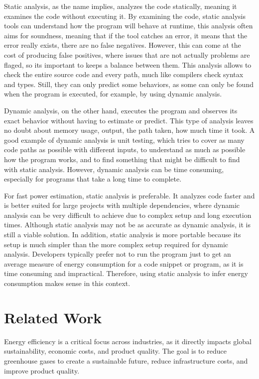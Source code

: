 \documentclass[sigplan]{acmart}
\begin{document}
Static analysis, as the name implies, analyzes the code statically, meaning it examines the code without executing it. By examining the code, static analysis tools can understand how the program will behave at runtime\cite{ernst2003static}, this analysis often aims for soundness, meaning that if the tool catches an error, it means that the error really exists, there are no false negatives. However, this can come at the cost of producing false positives, where issues that are not actually problems are flaged, so its important to keeps a balance between them. This analysis allows to check the entire source code and every path, much like compilers check syntax and types. Still, they can only predict some behaviors, as some can only be found when the program is executed, for example, by using dynamic analysis.

Dynamic analysis, on the other hand, executes the program and observes its exact behavior without having to estimate or predict. This type of analysis leaves no doubt about memory usage, output, the path taken, how much time it took\cite{ernst2003static}. A good example of dynamic analysis is unit testing, which tries to cover as many code paths as possible with different inputs, to understand as much as possible how the program works, and to find something that might be difficult to find with static analysis. However, dynamic analysis can be time consuming, especially for programs that take a long time to complete.

For fast power estimation, static analysis is preferable. It analyzes code faster and is better suited for large projects with multiple dependencies, where dynamic analysis can be very difficult to achieve due to complex setup and long execution times. Although static analysis may not be as accurate as dynamic analysis, it is still a viable solution. In addition, static analysis is more portable because its setup is much simpler than the more complex setup required for dynamic analysis.
Developers typically prefer not to run the program just to get an average measure of energy consumption for a code snippet or program, as it is time consuming and impractical. Therefore, using static analysis to infer energy consumption makes sense in this context.


\section{Related Work} \label{sec:relatedwork}

Energy efficiency is a critical focus across industries, as it directly impacts global sustainability, economic costs, and product quality.  The goal is to reduce greenhouse gases to create a sustainable future, reduce infrastructure costs, and improve product quality\cite{annurev:/content/journals/10.1146/annurev.resource.102308.124234}. 
\end{document}
